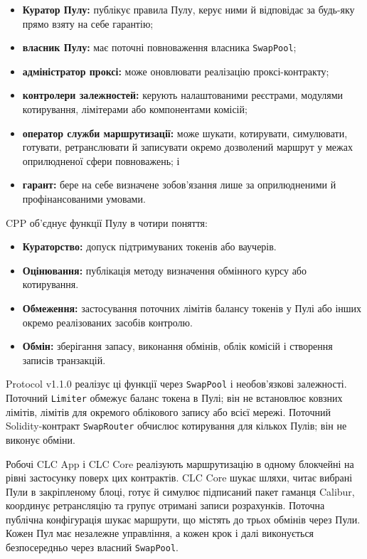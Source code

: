 \documentclass[11pt]{article}
\begin{document}
\begin{itemize}[leftmargin=*]
\item \textbf{Куратор Пулу:} публікує правила Пулу, керує ними й відповідає за будь-яку прямо взяту на себе гарантію;
\item \textbf{власник Пулу:} має поточні повноваження власника \texttt{SwapPool};
\item \textbf{адміністратор проксі:} може оновлювати реалізацію проксі-контракту;
\item \textbf{контролери залежностей:} керують налаштованими реєстрами, модулями котирування, лімітерами або компонентами комісій;
\item \textbf{оператор служби маршрутизації:} може шукати, котирувати, симулювати, готувати, ретранслювати й записувати окремо дозволений маршрут у межах оприлюдненої сфери повноважень; і
\item \textbf{гарант:} бере на себе визначене зобов'язання лише за оприлюдненими й профінансованими умовами.
\end{itemize}
CPP об'єднує функції Пулу в чотири поняття:

\begin{itemize}[leftmargin=*]
\item \textbf{Кураторство:} допуск підтримуваних токенів або ваучерів.
\item \textbf{Оцінювання:} публікація методу визначення обмінного курсу або котирування.
\item \textbf{Обмеження:} застосування поточних лімітів балансу токенів у Пулі або інших окремо реалізованих засобів контролю.
\item \textbf{Обмін:} зберігання запасу, виконання обмінів, облік комісій і створення записів транзакцій.
\end{itemize}
Protocol v1.1.0 реалізує ці функції через \texttt{SwapPool} і необов'язкові залежності. Поточний \texttt{Limiter} обмежує баланс токена в Пулі; він не встановлює ковзних лімітів, лімітів для окремого облікового запису або всієї мережі. Поточний Solidity-контракт \texttt{SwapRouter} обчислює котирування для кількох Пулів; він не виконує обміни.

Робочі CLC App і CLC Core реалізують маршрутизацію в одному блокчейні на рівні застосунку поверх цих контрактів. CLC Core шукає шляхи, читає вибрані Пули в закріпленому блоці, готує й симулює підписаний пакет гаманця Calibur, координує ретрансляцію та групує отримані записи розрахунків. Поточна публічна конфігурація шукає маршрути, що містять до трьох обмінів через Пули. Кожен Пул має незалежне управління, а кожен крок і далі виконується безпосередньо через власний \texttt{SwapPool}.
\end{document}
